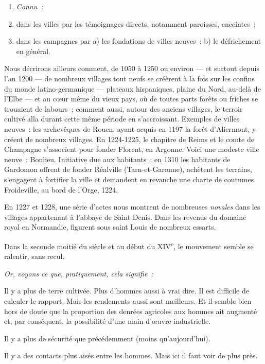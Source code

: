\documentclass[french,twoside]{book} %
\newlength{\listmod}
\newcommand{\listhead}[1]{\hspace{-1\listmod}\emph{#1}}
\begin{document}
\begin{enumerate}[itemsep=0pt,]
\item[]\listhead{Connu :}
\item dans les villes par les témoignages directs, notamment paroisses, enceintes ;
\item dans les campagnes par a) les fondations de villes neuves ; b) le défrichement en général.
\end{enumerate}

\noindent Nous décrirons ailleurs comment, de 1050 à 1250 ou environ — et surtout depuis l’an 1200 — de nombreux villages tout neufs se créèrent à la fois sur les confins du monde latino-germanique — plateaux hispaniques, plaine du Nord, au-delà de l’Elbe — et au cœur même du vieux pays, où de toutes parts forêts ou friches se trouaient de labours ; comment aussi, autour des anciens villages, le terroir cultivé alla durant cette même période en s’accroissant. Exemples de villes neuves : les archevêques de Rouen, ayant acquis en 1197 la forêt d’Aliermont, y créent de nombreux villages. En 1224-1225, le chapitre de Reims et le comte de Champagne s’associent pour fonder Florent, en Argonne. Voici une modeste ville neuve : Bonlieu. Initiative due aux habitants : en 1310 les habitants de Gardomon offrent de fonder Réalville (Tarn-et-Garonne), achètent les terrains, s’engagent à fortifier la ville et demandent en revanche une charte de coutumes. Froideville, au bord de l’Orge, 1224.\par
En 1227 et 1228, une série d’actes nous montrent de nombreuses {\itshape novales} dans les villages appartenant à l’abbaye de Saint-Denis. Dans les revenus du domaine royal en Normandie, figurent sous saint Louis de nombreux essarts.\par
Dans la seconde moitié du siècle et au début du XIV\textsuperscript{e}, le mouvement semble se ralentir, sans recul.\par

\begin{listalpha}[itemsep=0pt,]
\item[]\listhead{Or, voyons ce que, pratiquement, cela signifie :}
\item Il y a plus de terre cultivée. Plus d’hommes aussi à vrai dire. Il est difficile de calculer le rapport. Mais les rendements aussi sont meilleurs. Et il semble bien hors de doute que la proportion des denrées agricoles aux hommes ait augmenté et, par conséquent, la possibilité d’une main-d’œuvre industrielle.
\item Il y a plus de sécurité que précédemment (moins qu’aujourd’hui).
\item Il y a des contacts plus aisés entre les hommes. Mais ici il faut voir de plus près.
\end{listalpha}
\end{document}
